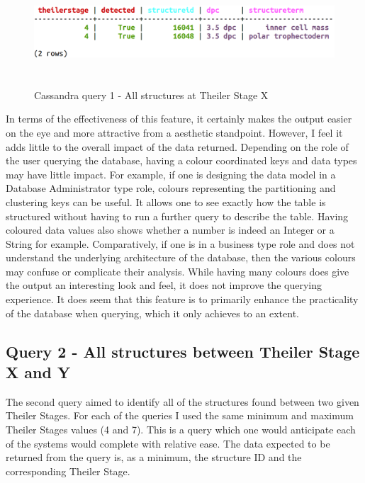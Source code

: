 \begin{figure}[H]\begin{center}\includegraphics[height=4cm,width=0.9\linewidth]{images/cassandraquery1}\caption{Cassandra query 1 - All structures at Theiler Stage X}\label{fig:cassandraquery1}\end{center}\end{figure}

In terms of the effectiveness of this feature, it certainly makes the output easier on the eye and more attractive from a aesthetic standpoint. However, I feel it adds little to the overall impact of the data returned. Depending on the role of the user querying the database, having a colour coordinated keys and data types may have little impact. For example, if one is designing the data model in a Database Administrator type role, colours representing the partitioning and clustering keys can be useful. It allows one to see exactly how the table is structured without having to run a further query to describe the table. Having coloured data values also shows whether a number is indeed an Integer or a String for example. Comparatively, if one is in a business type role and does not understand the underlying architecture of the database, then the various colours may confuse or complicate their analysis. While having many colours does give the output an interesting look and feel, it does not improve the querying experience. It does seem that this feature is to primarily enhance the practicality of the database when querying, which it only achieves to an extent.

\subsection*{Query 2 - All structures between Theiler Stage X and Y}\label{query2}
The second query aimed to identify all of the structures found between two given Theiler Stages. For each of the queries I used the same minimum and maximum Theiler Stages values (4 and 7). This is a query which one would anticipate each of the systems would complete with relative ease. The data expected to be returned from the query is, as a minimum, the structure ID and the corresponding Theiler Stage. 

